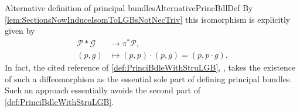 \documentclass[reqno,a4paper,oneside]{amsart}
\theoremstyle{plain}
\theoremstyle{remark}
\theoremstyle{definition}
\begin{document}
\begin{remarks}{Alternative definition of principal bundles}{AlternativePrincBdlDef}
By \ref{lem:SectionsNowInduceIsomToLGBsNotNecTriv} this isomorphism is explicitly given by
\begin{align*}
\mathcal{P}*\mathcal{G} &\to \pi^*\mathcal{P},\\
(p, g) &\mapsto (p,p) \cdot (p, g) = (p, p \cdot g).
\end{align*}
In fact, the cited reference of \ref{def:PrinciBdleWithStruLGB}, \cite[simplification of the beginning of \S 5.7, page 144f.]{GroupoidBasedPrincipalBundles}, takes the existence of such a diffeomorphism as the essential sole part of defining principal bundles. Such an approach essentially avoids the second part of \ref{def:PrinciBdleWithStruLGB}.
\end{remarks}
\end{document}

